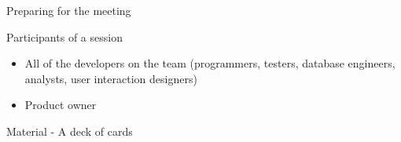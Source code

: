 \documentclass[dvips,11pt,xcolor=dvipsnames]{beamer}
\numberwithin{table}{section}
\numberwithin{figure}{section} %
\begin{document}
\begin{frame}{Preparing for the meeting}

  \begin{alertblock}{Participants of a session}

    \begin{itemize}
    \item All of the developers on the team (programmers, testers, database engineers, analysts, user interaction designers)
    \item Product owner
    \end{itemize}
  \end{alertblock}
  
  \begin{exampleblock}{Material - A deck of cards}

\def \scale{0.04}
    \begin{figure}
      \begin{centering}

\end{centering}
\end{figure}
\end{exampleblock}
\end{frame}
\end{document}
